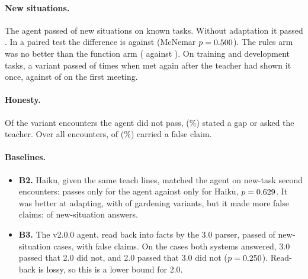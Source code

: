 \paragraph{New situations.} The agent passed \runHThreeRThreeFunctionSFirstPass{} of \runHThreeRThreeFunctionSFirstN{} new situations on known tasks. Without adaptation it passed \runHThreeRThreeBOneSFirstPass. In a paired test the difference is \pairFunctionVsBOneOnlyA{} against \pairFunctionVsBOneOnlyB{} (McNemar $p=0.500$). The rules arm was no better than the function arm (\pairFunctionVsRulesOnlyA{} against \pairFunctionVsRulesOnlyB). On training and development tasks, a variant passed \runCOneBothREightVariantRepeatPass{} of \runCOneBothREightVariantRepeatN{} times when met again after the teacher had shown it once, against \runCOneBothREightVariantPass{} of \runCOneBothREightVariantN{} on the first meeting.

\paragraph{Honesty.} Of the \finalGapCases{} variant encounters the agent did not pass, \finalHonest{} (\finalHonestRate\%) stated a gap or asked the teacher. Over all encounters, \finalWrong{} of \finalN{} (\finalWrongRate\%) carried a false claim.

\paragraph{Baselines.}
\begin{itemize}
  \item \textbf{B2.} Haiku, given the same teach lines, matched the agent on new-task second encounters: \pairAgentVsBTwoOnlyA{} passes only for the agent against \pairAgentVsBTwoOnlyB{} only for Haiku, $p=0.629$. It was better at adapting, with \runBTwoHThreeGVariantPass{} of \runBTwoHThreeGVariantN{} gardening variants, but it made more false claims: \runBTwoHThreeSFirstWrong{} of \runBTwoHThreeSFirstN{} new-situation answers.
  \item \textbf{B3.} The v2.0.0 agent, read back into facts by the 3.0 parser, passed \runBThreeReplaySFirstPass{} of \runBThreeReplaySFirstN{} new-situation cases, with \runBThreeReplaySFirstWrong{} false claims. On the \pairAgentVsBThreeN{} cases both systems answered, 3.0 passed \pairAgentVsBThreeOnlyA{} that 2.0 did not, and 2.0 passed \pairAgentVsBThreeOnlyB{} that 3.0 did not ($p=0.250$). Read-back is lossy, so this is a lower bound for 2.0.
\end{itemize}

